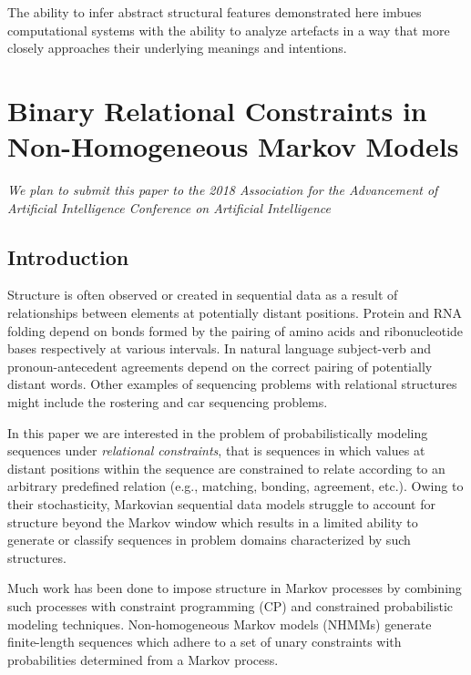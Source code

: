 \documentclass[phd,electronic,oneside,twosidetoc,letterpaper,chaptercenter,parttop,lol,lof,lot]{byumsphd}
\begin{document}
The ability to infer abstract structural features demonstrated here imbues computational systems with the ability to analyze artefacts in a way that more closely approaches their underlying meanings and intentions.

\chapter{Binary Relational Constraints in Non-Homogeneous Markov Models}

\emph{We plan to submit this paper to the 2018 Association for the Advancement of Artificial Intelligence Conference on Artificial Intelligence}

\section{Introduction}

Structure is often observed or created in sequential data as a result of relationships between elements at potentially distant positions. Protein and RNA folding depend on bonds formed by the pairing of amino acids and ribonucleotide bases respectively at various intervals. In natural language subject-verb and pronoun-antecedent agreements depend on the correct pairing of potentially distant words. Other examples of sequencing problems with relational structures might include the rostering and car sequencing problems.

In this paper we are interested in the problem of probabilistically modeling sequences under \textit{relational constraints}, that is sequences in which values at distant positions within the sequence are constrained to relate according to an arbitrary predefined relation (e.g., matching, bonding, agreement, etc.). Owing to their stochasticity, Markovian sequential data models struggle to account for structure beyond the Markov window which results in a limited ability to generate or classify sequences in problem domains characterized by such structures. 

Much work has been done to impose structure in Markov processes by combining such processes with constraint programming (CP) and constrained probabilistic modeling techniques. Non-homogeneous Markov models (NHMMs) \cite{pachet2011finite} generate finite-length sequences which adhere to a set of unary constraints with probabilities determined from a Markov process.
\end{document}
